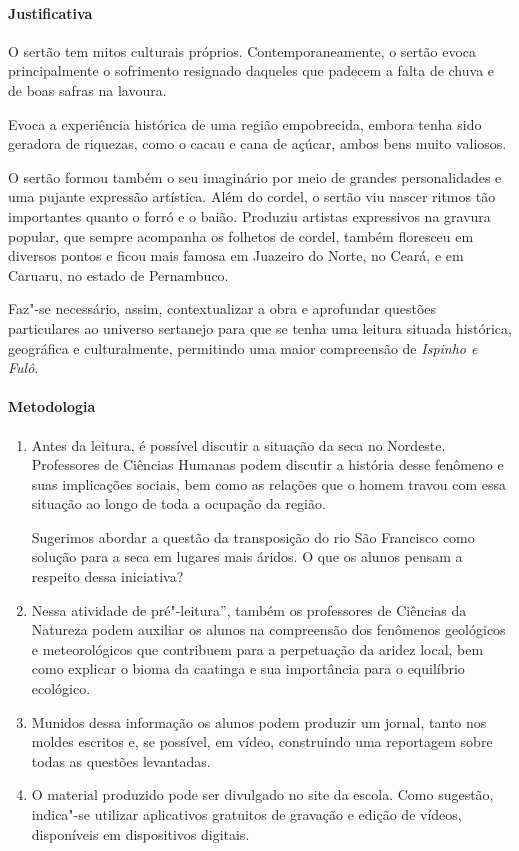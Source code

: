 \documentclass[12pt]{extarticle}
\begin{document}
\paragraph{Justificativa} O sertão tem mitos culturais próprios. 
Contemporaneamente, o sertão evoca principalmente o sofrimento resignado
daqueles que padecem a falta de chuva e de boas safras
na lavoura. 

Evoca a experiência histórica de uma região
empobrecida, embora tenha sido geradora de riquezas, como
o cacau e cana de açúcar, ambos bens muito valiosos.

O sertão formou também o seu imaginário por meio de
grandes personalidades e uma pujante expressão artística.
Além do cordel, o sertão viu nascer ritmos tão importantes
quanto o forró e o baião. Produziu artistas expressivos na 
gravura popular, que sempre acompanha os folhetos de cordel,
também floresceu em diversos pontos e ficou mais famosa
em Juazeiro do Norte, no Ceará, e em Caruaru, no estado
de Pernambuco.

Faz"-se necessário, assim, contextualizar a obra e aprofundar questões 
particulares ao universo sertanejo para que se tenha uma leitura situada histórica, geográfica e culturalmente, 
permitindo uma maior compreensão de \textit{Ispinho e Fulô}. 

\paragraph{Metodologia}

\begin{enumerate}
\item
Antes da leitura, é possível discutir a situação da seca no
Nordeste. Professores de Ciências Humanas podem discutir a história
desse fenômeno e suas implicações sociais, bem como as relações que o
homem travou com essa situação ao longo de toda a ocupação da região.

Sugerimos abordar a questão da transposição do rio São Francisco como 
solução para a seca em lugares mais áridos. O que os alunos pensam a 
respeito dessa iniciativa? 

\item
Nessa atividade de pré"-leitura'', também os professores de Ciências da 
Natureza podem auxiliar os alunos na compreensão dos fenômenos geológicos 
e meteorológicos que contribuem para a perpetuação da aridez local, bem 
como explicar o bioma da caatinga e sua importância para o equilíbrio 
ecológico. 

\item
Munidos dessa informação os alunos podem produzir um jornal, tanto nos 
moldes escritos e, se possível, em vídeo, construindo uma reportagem 
sobre todas as questões levantadas. 

\item
O material produzido pode ser divulgado no site da
escola. Como sugestão, indica"-se utilizar aplicativos gratuitos de
gravação e edição de vídeos, disponíveis em dispositivos digitais.

\end{enumerate}
\end{document}
